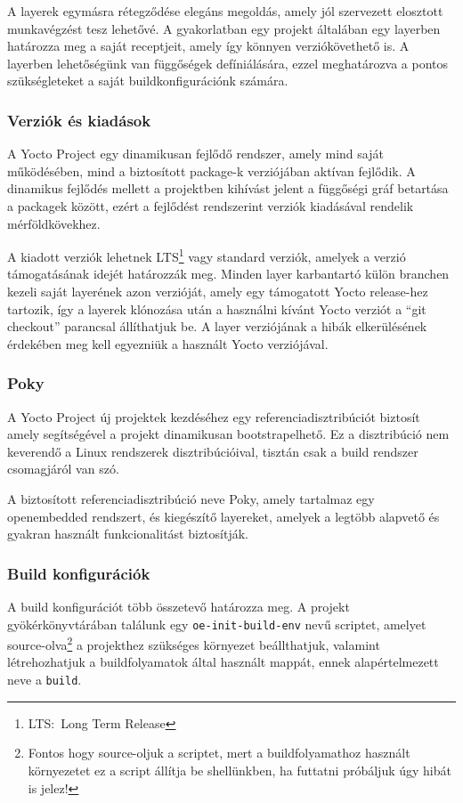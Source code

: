 A layerek egymásra rétegződése elegáns megoldás, amely jól szervezett elosztott
munkavégzést tesz lehetővé. A gyakorlatban egy projekt általában egy layerben
határozza meg a saját receptjeit, amely így könnyen verziókövethető is. A
layerben lehetőségünk van függőségek defíniálására, ezzel meghatározva a pontos
szükségleteket a saját buildkonfigurációnk számára. 

\subsubsection{Verziók és kiadások}

A Yocto Project egy dinamikusan fejlődő rendszer, amely mind saját működésében,
mind a biztosított package-k verziójában aktívan fejlődik. A dinamikus fejlődés
mellett a projektben kihívást jelent a függőségi gráf betartása a packagek
között, ezért a fejlődést rendszerint verziók kiadásával rendelik
mérföldkövekhez.

A kiadott verziók lehetnek LTS\footnote{LTS:~Long Term Release} vagy standard verziók,
amelyek a verzió támogatásának idejét határozzák meg. Minden layer karbantartó
külön branchen kezeli saját layerének azon verzióját, amely egy támogatott Yocto
release-hez tartozik, így a layerek klónozása után a használni kívánt Yocto
verziót a ``git checkout'' parancsal állíthatjuk be. A layer verziójának a hibák
elkerülésének érdekében meg kell egyezniük a használt Yocto verziójával.

\subsubsection{Poky}

A Yocto Project új projektek kezdéséhez egy referenciadisztribúciót biztosít
amely segítségével a projekt dinamikusan bootstrapelhető. Ez a disztribúció nem
keverendő a Linux rendszerek disztribúcióival, tisztán csak a build rendszer
csomagjáról van szó.

A biztosított referenciadisztribúció neve Poky, amely tartalmaz egy openembedded
rendszert, és kiegészítő layereket, amelyek a legtöbb alapvető és gyakran
használt funkcionalitást biztosítják.

\subsubsection{Build konfigurációk}

A build konfigurációt több összetevő határozza meg. A projekt gyökérkönyvtárában
találunk egy \verb|oe-init-build-env| nevű scriptet, amelyet
source-olva\footnote{Fontos hogy source-oljuk a scriptet, mert a buildfolyamathoz
használt környezetet ez a script állítja be shellünkben, ha futtatni próbáljuk
úgy hibát is jelez!} a projekthez szükséges környezet beállthatjuk, valamint
létrehozhatjuk a buildfolyamatok által használt mappát, ennek alapértelmezett
neve a \verb|build|.

